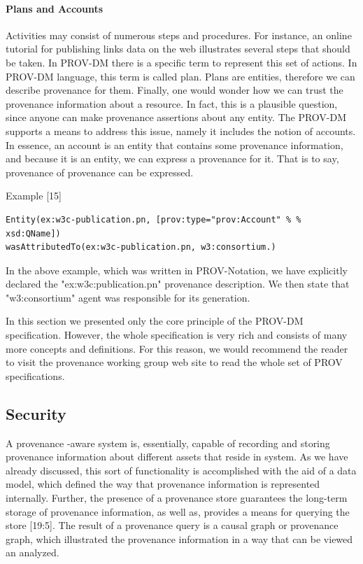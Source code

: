 \paragraph{Plans and Accounts}

Activities may consist of numerous steps and procedures. For instance, an online tutorial for publishing links data on the web illustrates several steps that should be taken. In PROV-DM there is a specific term to represent this set of actions. In PROV-DM language, this term is called plan. Plans are entities, therefore we can describe provenance for them.
Finally, one would wonder how we can trust the provenance information about a resource. In fact, this is a plausible question, since anyone can make provenance assertions about any entity. The PROV-DM supports a means to address this issue, namely it includes the notion of accounts. In essence, an account is an entity that contains some provenance information, and because it is an entity, we can express a provenance for it. That is to say, provenance of provenance can be expressed.

Example [15]
\begin{verbatim}
Entity(ex:w3c-publication.pn, [prov:type="prov:Account" % % xsd:QName])
wasAttributedTo(ex:w3c-publication.pn, w3:consortium.)
\end{verbatim}

In the above example, which was written in PROV-Notation, we have explicitly declared the "ex:w3c:publication.pn" provenance description. We then state that "w3:consortium" agent was responsible for its generation.

In this section we presented only the core principle of the PROV-DM specification. However, the whole specification is very rich and consists of many more concepts and definitions. For this reason, we would recommend the reader to visit the provenance working group web site to read the whole set of PROV specifications.

\subsection{Security}

A provenance -aware system is, essentially, capable of recording and storing provenance information about different assets that reside in system. As we have already discussed, this sort of functionality is accomplished with the aid of a data model, which defined the way that provenance information is represented internally. Further, the presence of a provenance store guarantees the long-term storage of provenance information, as well as, provides a means for querying the store [19:5]. The result of a provenance query is a causal graph or provenance graph, which illustrated the provenance information in a way that can be viewed an analyzed.

